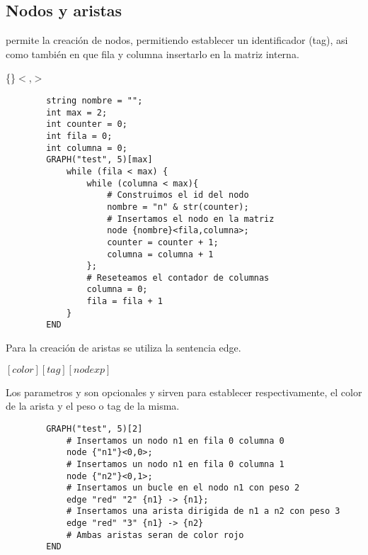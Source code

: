 \documentclass{article}
\begin{document}
    \subsection{Nodos y aristas}
     permite la creación de nodos, permitiendo establecer un identificador (tag), asi como también 
    en que fila y columna insertarlo en la matriz interna.
    \begin{center}
        \{\}$<$,$>$
    \end{center}
    \begin{lstlisting}
        string nombre = "";
        int max = 2;
        int counter = 0;
        int fila = 0;
        int columna = 0;
        GRAPH("test", 5)[max]
            while (fila < max) {
                while (columna < max){
                    # Construimos el id del nodo
                    nombre = "n" & str(counter);
                    # Insertamos el nodo en la matriz
                    node {nombre}<fila,columna>;
                    counter = counter + 1;
                    columna = columna + 1
                };
                # Reseteamos el contador de columnas
                columna = 0;
                fila = fila + 1
            }
        END
    \end{lstlisting}
    Para la creación de aristas se utiliza la sentencia edge. 
    \begin{center}
         $\left[color\right] \left[tag\right]  \left[nodexp\right]$
    \end{center}
    Los parametros  y  son opcionales y sirven para establecer respectivamente, 
    el color de la arista y el peso o tag de la misma.
    \begin{lstlisting}
        GRAPH("test", 5)[2]
            # Insertamos un nodo n1 en fila 0 columna 0
            node {"n1"}<0,0>;
            # Insertamos un nodo n1 en fila 0 columna 1
            node {"n2"}<0,1>;
            # Insertamos un bucle en el nodo n1 con peso 2
            edge "red" "2" {n1} -> {n1};
            # Insertamos una arista dirigida de n1 a n2 con peso 3
            edge "red" "3" {n1} -> {n2}
            # Ambas aristas seran de color rojo
        END
    \end{lstlisting}

    \newpage
\end{document}
